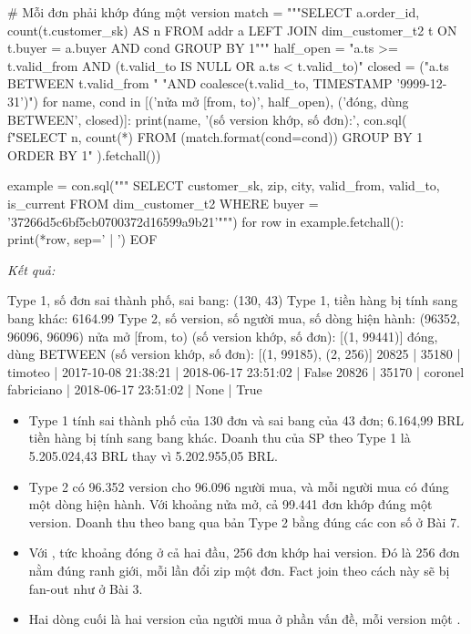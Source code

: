 \begin{codeblock}
# Mỗi đơn phải khớp đúng một version
match = """SELECT a.order_id, count(t.customer_sk) AS n
           FROM addr a LEFT JOIN dim_customer_t2 t ON t.buyer = a.buyer AND {cond}
           GROUP BY 1"""
half_open = "a.ts >= t.valid_from AND (t.valid_to IS NULL OR a.ts < t.valid_to)"
closed = ("a.ts BETWEEN t.valid_from "
          "AND coalesce(t.valid_to, TIMESTAMP '9999-12-31')")
for name, cond in [('nửa mở [from, to)', half_open),
                   ('đóng, dùng BETWEEN', closed)]:
    print(name, '(số version khớp, số đơn):', con.sql(
        f"SELECT n, count(*) FROM ({match.format(cond=cond)}) GROUP BY 1 ORDER BY 1"
    ).fetchall())

example = con.sql("""
  SELECT customer_sk, zip, city, valid_from, valid_to, is_current
  FROM dim_customer_t2 WHERE buyer = '37266d5c6bf5cb0700372d16599a9b21'""")
for row in example.fetchall():
    print(*row, sep=' | ')
EOF
\end{codeblock}
\textit{Kết quả:}
\begin{codeblock}
Type 1, số đơn sai thành phố, sai bang: (130, 43)
Type 1, tiền hàng bị tính sang bang khác: 6164.99
Type 2, số version, số người mua, số dòng hiện hành: (96352, 96096, 96096)
nửa mở [from, to) (số version khớp, số đơn): [(1, 99441)]
đóng, dùng BETWEEN (số version khớp, số đơn): [(1, 99185), (2, 256)]
20825 | 35180 | timoteo | 2017-10-08 21:38:21 | 2018-06-17 23:51:02 | False
20826 | 35170 | coronel fabriciano | 2018-06-17 23:51:02 | None | True
\end{codeblock}

\begin{itemize}
  \item Type 1 tính sai thành phố của 130 đơn và sai bang của 43 đơn; 6.164,99 BRL tiền hàng bị tính sang bang khác. Doanh thu của SP theo Type 1 là 5.205.024,43 BRL thay vì 5.202.955,05 BRL.
  \item Type 2 có 96.352 version cho 96.096 người mua, và mỗi người mua có đúng một dòng hiện hành. Với khoảng nửa mở, cả 99.441 đơn khớp đúng một version. Doanh thu theo bang qua bản Type 2 bằng đúng các con số ở Bài 7.
  \item Với , tức khoảng đóng ở cả hai đầu, 256 đơn khớp hai version. Đó là 256 đơn nằm đúng ranh giới, mỗi lần đổi zip một đơn. Fact join theo cách này sẽ bị fan-out như ở Bài 3.
  \item Hai dòng cuối là hai version của người mua ở phần vấn đề, mỗi version một .
\end{itemize}

